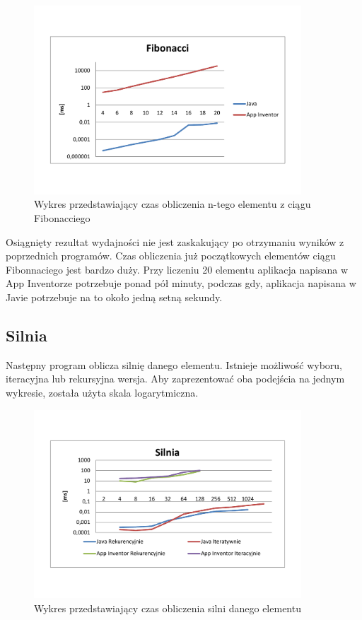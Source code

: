 \begin{figure}[H]
\centering\includegraphics[width=10cm]{figures/apps/fibonacciChart}
\caption{Wykres przedstawiający czas obliczenia n-tego elementu z ciągu Fibonacciego}
\end{figure}

Osiągnięty rezultat wydajności nie jest zaskakujący po otrzymaniu wyników z poprzednich programów. Czas obliczenia już początkowych elementów ciągu Fibonnaciego jest bardzo duży. Przy liczeniu 20 elementu aplikacja napisana w App Inventorze potrzebuje ponad pół minuty, podczas gdy, aplikacja napisana w Javie potrzebuje na to około jedną setną sekundy.


\subsection{Silnia}

Następny program oblicza silnię danego elementu. Istnieje możliwość wyboru, iteracyjna lub rekursyjna wersja. Aby zaprezentować oba podejścia na jednym wykresie, została użyta skala logarytmiczna.

\begin{figure}[H]
\centering\includegraphics[width=10cm]{figures/apps/factorialChart}
\caption{Wykres przedstawiający czas obliczenia silni danego elementu}
\end{figure}

